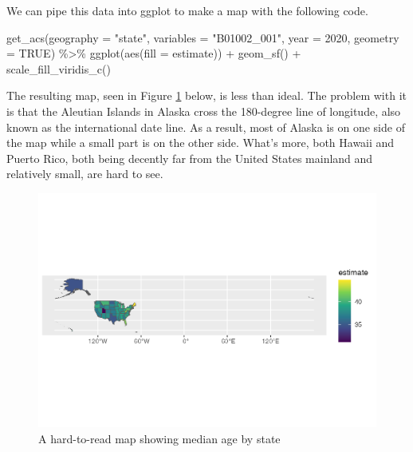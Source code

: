 \documentclass[
]{book}
\newenvironment{Shaded}{\begin{snugshade}}{\end{snugshade}}
\newcommand{\AttributeTok}[1]{\textcolor[rgb]{0.77,0.63,0.00}{#1}}
\newcommand{\ConstantTok}[1]{\textcolor[rgb]{0.00,0.00,0.00}{#1}}
\newcommand{\DecValTok}[1]{\textcolor[rgb]{0.00,0.00,0.81}{#1}}
\newcommand{\FunctionTok}[1]{\textcolor[rgb]{0.00,0.00,0.00}{#1}}
\newcommand{\NormalTok}[1]{#1}
\newcommand{\SpecialCharTok}[1]{\textcolor[rgb]{0.00,0.00,0.00}{#1}}
\newcommand{\StringTok}[1]{\textcolor[rgb]{0.31,0.60,0.02}{#1}}
\begin{document}
We can pipe this data into ggplot to make a map with the following code.

\begin{Shaded}
\begin{Highlighting}[]
\FunctionTok{get\_acs}\NormalTok{(}\AttributeTok{geography =} \StringTok{"state"}\NormalTok{,}
        \AttributeTok{variables =} \StringTok{"B01002\_001"}\NormalTok{,}
        \AttributeTok{year =} \DecValTok{2020}\NormalTok{,}
        \AttributeTok{geometry =} \ConstantTok{TRUE}\NormalTok{) }\SpecialCharTok{\%\textgreater{}\%} 
  \FunctionTok{ggplot}\NormalTok{(}\FunctionTok{aes}\NormalTok{(}\AttributeTok{fill =}\NormalTok{ estimate)) }\SpecialCharTok{+}
  \FunctionTok{geom\_sf}\NormalTok{() }\SpecialCharTok{+}
  \FunctionTok{scale\_fill\_viridis\_c}\NormalTok{()}
\end{Highlighting}
\end{Shaded}

The resulting map, seen in Figure \ref{fig:median-age-map-bad} below, is less than ideal. The problem with it is that the Aleutian Islands in Alaska cross the 180-degree line of longitude, also known as the international date line. As a result, most of Alaska is on one side of the map while a small part is on the other side. What's more, both Hawaii and Puerto Rico, both being decently far from the United States mainland and relatively small, are hard to see.

\begin{figure}
\includegraphics[width=1\linewidth]{accessing-data_files/figure-latex/median-age-map-bad-1} \caption{A hard-to-read map showing median age by state}\label{fig:median-age-map-bad}
\end{figure}
\end{document}
